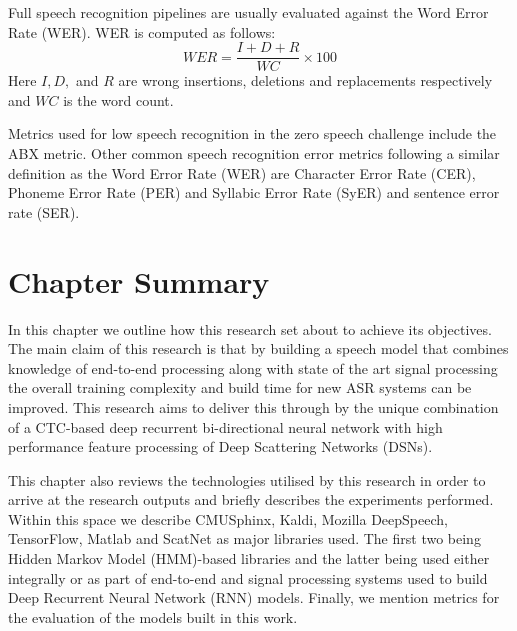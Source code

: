 Full speech recognition pipelines are usually evaluated against the Word Error Rate (WER).  WER is computed as follows:
\begin{equation}\label{eqn_2_3_wer}
WER=\frac{I+D+R}{WC}\times 100
\end{equation}
Here $I,D,$ and $R$ are wrong insertions, deletions and replacements respectively and $WC$ is the word count.

Metrics used for low speech recognition in the zero speech challenge \citep{versteegh2015zero} include the ABX metric. Other common speech recognition error metrics following a similar definition as the Word Error Rate (WER) are Character Error Rate (CER), Phoneme Error Rate (PER) and Syllabic Error Rate (SyER) and sentence error rate (SER).

\section{Chapter Summary}
In this chapter we outline how this research set about to achieve its objectives.  The main claim of this research is that by building a speech model that combines knowledge of end-to-end processing along with state of the art signal processing the overall training complexity and build time for new ASR systems can be improved.  This research aims to deliver this through by the unique combination of a CTC-based deep recurrent bi-directional neural network with high performance feature processing of Deep Scattering Networks (DSNs).

This chapter also reviews the technologies utilised by this research in order to arrive at the research outputs and briefly describes the experiments performed.  Within this space we describe CMUSphinx, Kaldi, Mozilla DeepSpeech, TensorFlow, Matlab and ScatNet as major libraries used.   The first two being Hidden Markov Model (HMM)-based libraries and the latter being used either integrally or as part of end-to-end  and signal processing systems used to build Deep Recurrent Neural Network (RNN) models. Finally, we mention metrics for the evaluation of the models built in this work.
